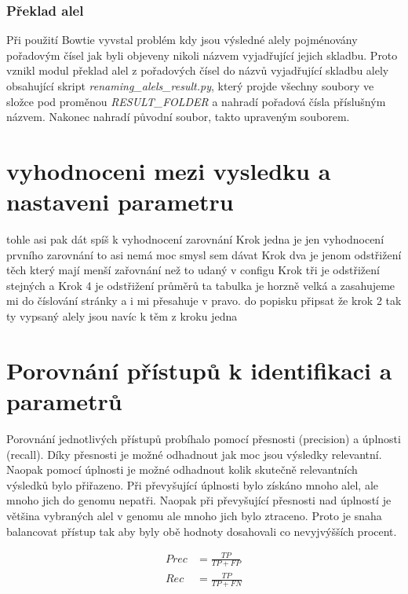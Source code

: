 \documentclass[czech,DP]{thesiskiv}
\numberwithin{equation}{section}
\begin{document}
\subsection{Překlad alel}
Při použití Bowtie vyvstal problém kdy jsou výsledné alely pojménovány pořadovým čísel jak byli objeveny nikoli názvem vyjadřující jejich skladbu. Proto vznikl modul překlad alel z pořadových čísel do názvů vyjadřující skladbu alely obsahující skript \textit{renaming\_alels\_result.py}, který projde všechny soubory ve složce pod proměnou \textit{RESULT\_FOLDER} a nahradí pořadová čísla příslušným názvem. Nakonec nahradí původní soubor, takto upraveným souborem.



\chapter{vyhodnoceni mezi vysledku a nastaveni parametru}
tohle asi pak dát spíš k vyhodnocení zarovnání
Krok jedna je jen vyhodnocení prvního zarovnání to asi nemá moc smysl sem dávat
Krok dva je jenom odstřižení těch který mají menší zařovnání než to udaný v configu 
Krok tři je odstřižení stejných a 
Krok 4 je odstřižení průměrů 
ta tabulka je horzně velká a zasahujeme mi do číslování stránky a i mi přesahuje v pravo.
do popisku připsat že krok 2 tak ty vypsaný alely jsou navíc k těm z kroku jedna




\chapter{Porovnání přístupů k identifikaci a parametrů}
Porovnání jednotlivých přístupů probíhalo pomocí přesnosti (precision) a úplnosti (recall). Díky přesnosti je možné odhadnout jak moc jsou výsledky relevantní. Naopak pomocí úplnosti je možné odhadnout kolik skutečně relevantních výsledků bylo přiřazeno. Při převyšující úplnosti bylo získáno mnoho alel, ale mnoho jich do genomu nepatři. Naopak při převyšující přesnosti nad úplností je většina vybraných alel v genomu ale mnoho jich bylo ztraceno. Proto je snaha balancovat přístup tak aby byly obě hodnoty dosahovali co nevyjvýšších procent. 

\begin{center}
	\begin{align}
   		\label{precision2} Prec &= \frac{TP}{TP + FP} \\[30pt]
   		\label{recall2} Rec &= \frac{TP}{TP + FN}
	\end{align}
\end{center}
\end{document}
